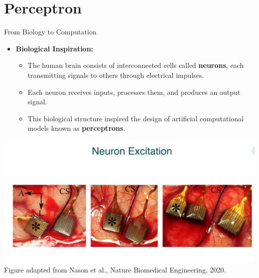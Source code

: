 \documentclass[serif, aspectratio=169]{beamer}
\begin{document}
    \section{Perceptron}

    \begin{frame}{From Biology to Computation}
        \begin{itemize}
            \item \textbf{Biological Inspiration:}
            \medskip
            \begin{itemize}\itemsep1em
            \item \justifying The human brain consists of interconnected cells called \textbf{neurons}, each transmitting signals to others through electrical impulses.
            \item \justifying Each neuron receives inputs, processes them, and produces an output signal.
            \item \justifying This biological structure inspired the design of artificial computational models known as \textbf{perceptrons}.
            \end{itemize}
        \end{itemize}
        \endminipage
        \hfill
        \centering
        \includegraphics[width=\linewidth]{pic/Figure_38.png}
        \vspace{0.3em}
        \scriptsize Figure adapted from Nason et al., Nature Biomedical Engineering, 2020.
        \endminipage
    \end{frame}
\end{document}
